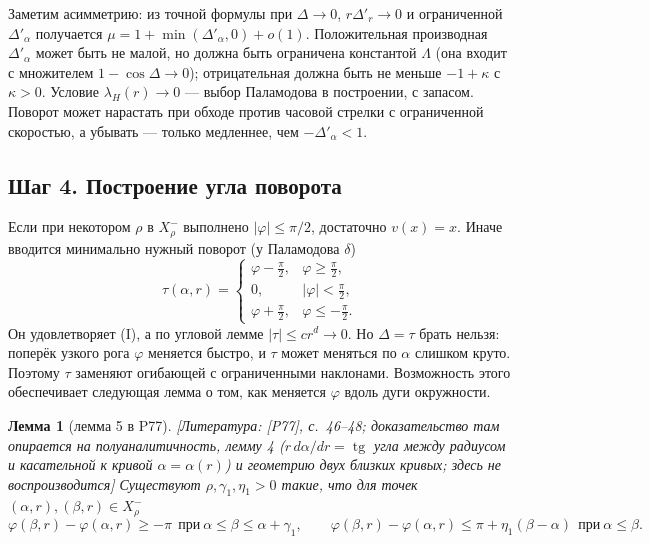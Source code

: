 \documentclass[11pt,a4paper]{article}
\newtheorem{lemma}[theorem]{Лемма}
\theoremstyle{definition}
\newcommand{\mk}[1]{\textsf{[#1]}}
\begin{document}
Заметим асимметрию: из точной формулы при $\Delta\to0$, $r\Delta'_r\to0$ и ограниченной
$\Delta'_\alpha$ получается $\mu=1+\min(\Delta'_\alpha,0)+o(1)$. Положительная производная
$\Delta'_\alpha$ может быть не малой, но должна быть ограничена константой $\Lambda$ (она входит с
множителем $1-\cos\Delta\to0$); отрицательная должна быть не меньше $-1+\kappa$ с $\kappa>0$.
Условие $\lambda_H(r)\to0$ --- выбор Паламодова в построении, с запасом. Поворот может нарастать
при обходе против часовой стрелки с ограниченной скоростью, а убывать --- только медленнее, чем
$-\Delta'_\alpha<1$.

\subsection{Шаг 4. Построение угла поворота}

Если при некотором $\rho$ в $X^-_\rho$ выполнено $|\varphi|\le\pi/2$, достаточно $v(x)=x$. Иначе
вводится минимально нужный поворот (у Паламодова $\delta$)
\[
\tau(\alpha,r)=\begin{cases}\varphi-\tfrac\pi2,&\varphi\ge\tfrac\pi2,\\ 0,&|\varphi|<\tfrac\pi2,\\
\varphi+\tfrac\pi2,&\varphi\le-\tfrac\pi2.\end{cases}
\]
Он удовлетворяет (I), а по угловой лемме $|\tau|\le cr^d\to0$. Но $\Delta=\tau$ брать нельзя:
поперёк узкого рога $\varphi$ меняется быстро, и $\tau$ может меняться по $\alpha$ слишком круто.
Поэтому $\tau$ заменяют огибающей с ограниченными наклонами. Возможность этого обеспечивает
следующая лемма о том, как меняется $\varphi$ вдоль дуги окружности.

\begin{lemma}[лемма 5 в P77]\label{lem:P77five}
\mk{Литература: [P77], с.~46--48; доказательство там опирается на полуаналитичность, лемму 4
($r\,d\alpha/dr=\operatorname{tg}$ угла между радиусом и касательной к кривой $\alpha=\alpha(r)$) и
геометрию двух близких кривых; здесь не воспроизводится} Существуют $\rho,\gamma_1,\eta_1>0$
такие, что для точек $(\alpha,r),(\beta,r)\in X^-_\rho$
\[
\varphi(\beta,r)-\varphi(\alpha,r)\ge-\pi\ \ \text{при}\ \alpha\le\beta\le\alpha+\gamma_1,\qquad
\varphi(\beta,r)-\varphi(\alpha,r)\le\pi+\eta_1(\beta-\alpha)\ \ \text{при}\ \alpha\le\beta.
\]
\end{lemma}
\end{document}

